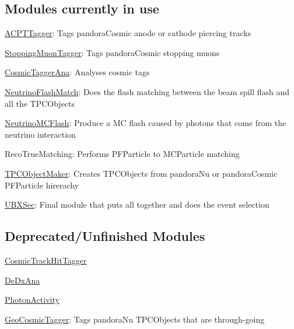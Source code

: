\subsection*{Modules currently in use}


\begin{DoxyItemize}
\item \hyperlink{classACPTTagger}{A\-C\-P\-T\-Tagger}\-: Tags pandora\-Cosmic anode or cathode piercing tracks
\item \hyperlink{classStoppingMuonTagger}{Stopping\-Muon\-Tagger}\-: Tags pandora\-Cosmic stopping muons
\item \hyperlink{classCosmicTaggerAna}{Cosmic\-Tagger\-Ana}\-: Analyses cosmic tags
\item \hyperlink{classNeutrinoFlashMatch}{Neutrino\-Flash\-Match}\-: Does the flash matching between the beam spill flash and all the T\-P\-C\-Objects
\item \hyperlink{classNeutrinoMCFlash}{Neutrino\-M\-C\-Flash}\-: Produce a M\-C flash caused by photons that come from the neutrino interaction
\item Reco\-True\-Matching\-: Performs P\-F\-Particle to M\-C\-Particle matching
\item \hyperlink{classTPCObjectMaker}{T\-P\-C\-Object\-Maker}\-: Creates T\-P\-C\-Objects from pandora\-Nu or pandora\-Cosmic P\-F\-Particle hirerachy
\item \hyperlink{classUBXSec}{U\-B\-X\-Sec}\-: Final module that puts all together and does the event selection
\end{DoxyItemize}

\subsection*{Deprecated/\-Unfinished Modules}


\begin{DoxyItemize}
\item \hyperlink{classCosmicTrackHitTagger}{Cosmic\-Track\-Hit\-Tagger}
\item \hyperlink{classDeDxAna}{De\-Dx\-Ana}
\item \hyperlink{classPhotonActivity}{Photon\-Activity}
\item \hyperlink{classGeoCosmicTagger}{Geo\-Cosmic\-Tagger}\-: Tags pandora\-Nu T\-P\-C\-Objects that are through-\/going 
\end{DoxyItemize}